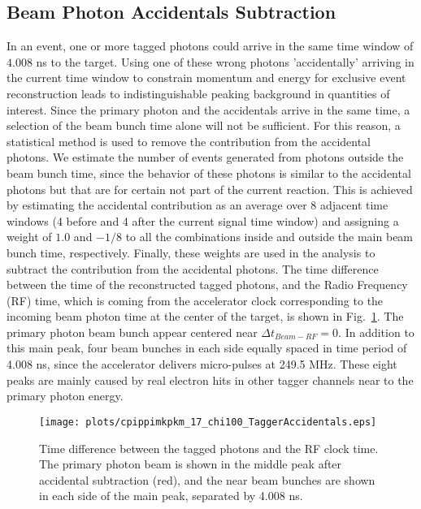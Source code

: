 \subsection{Beam Photon Accidentals Subtraction}
\label{chap.y2175.evt_sel.bea_pho_acc_sub}

In an event, one or more tagged photons could arrive in the same time window of $4.008$ ns to the target. Using one of these wrong photons 'accidentally' arriving in the current time window to constrain momentum and energy for exclusive event reconstruction leads to indistinguishable peaking background in quantities of interest. Since the primary photon and the accidentals arrive in the same time, a selection of the beam bunch time alone will not be sufficient. For this reason, a statistical method is used to remove the contribution from the accidental photons. We estimate the number of events generated from photons outside the beam bunch time, since the behavior of these photons is similar to the accidental photons but that are for certain not part of the current reaction. This is achieved by estimating the accidental contribution as an average over 8 adjacent time windows (4 before and 4 after the current signal time window) and assigning a weight of $1.0$ and $-1/8$ to all the combinations inside and outside the main beam bunch time, respectively. Finally, these weights are used in the analysis to subtract the contribution from the accidental photons. The time difference between the time of the reconstructed tagged photons, and the Radio Frequency (RF) time, which is coming from the accelerator clock corresponding to the incoming beam photon time at the center of the target, is shown in Fig.~\ref{fig.chap.y2175.evt_sel.bea_pho_acc_sub}. The primary photon beam bunch appear centered near $\Delta t_{Beam-RF} = 0$. In addition to this main peak, four beam bunches in each side equally spaced in time period of 4.008 ns, since the accelerator delivers micro-pulses at 249.5 MHz. These eight peaks are mainly caused by real electron hits in other tagger channels near to the primary photon energy.

\begin{figure}[H]
    \centering
        \texttt{[image: plots/cpippimkpkm\_17\_chi100\_TaggerAccidentals.eps]}
        \caption{Time difference between the tagged photons and the RF clock time. The primary photon beam is shown in the middle peak after accidental subtraction (red), and the near beam bunches are shown in each side of the main peak, separated by 4.008 ns.}
        \label{fig.chap.y2175.evt_sel.bea_pho_acc_sub}
\end{figure}

